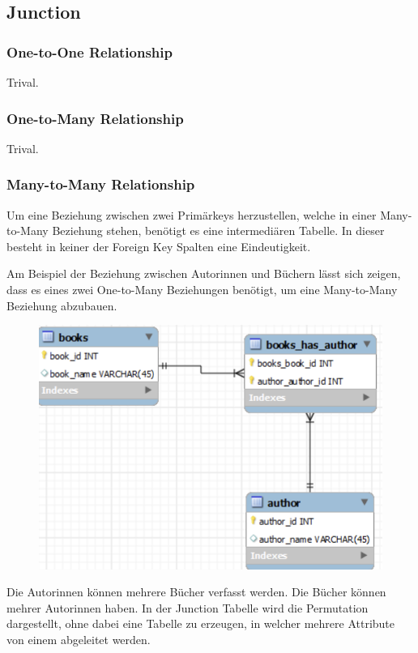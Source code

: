 \subsection{Junction}
\subsubsection{One-to-One Relationship}
Trival.
\subsubsection{One-to-Many Relationship}
Trival.
\subsubsection{Many-to-Many Relationship}
Um eine Beziehung zwischen zwei Primärkeys herzustellen, welche in einer Many-to-Many Beziehung stehen, benötigt es eine intermediären Tabelle.
In dieser besteht in keiner der Foreign Key Spalten eine Eindeutigkeit.

Am Beispiel der Beziehung zwischen Autorinnen und Büchern lässt sich zeigen, dass es eines zwei One-to-Many Beziehungen benötigt, um eine Many-to-Many Beziehung abzubauen.
\begin{figure}[H]
	\centering
	\includegraphics[scale = 0.3]{attachment/chapter_3/Scc040}
	\caption{}
	\label{fig:Scc040}
\end{figure}

Die Autorinnen können mehrere Bücher verfasst werden. Die Bücher können mehrer Autorinnen haben. In der Junction Tabelle wird die Permutation dargestellt, ohne dabei eine Tabelle zu erzeugen, in welcher mehrere Attribute von einem abgeleitet werden.

